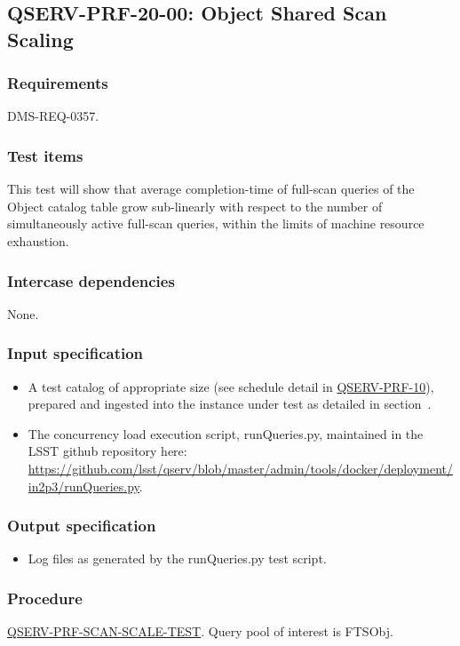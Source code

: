 \subsection{\textsc{QSERV-PRF-20-00}: Object Shared Scan Scaling}
\label{qserv-prf-20-00}

\subsubsection{Requirements}

DMS-REQ-0357.

\subsubsection{Test items}

This test will show that average completion-time of full-scan queries of the Object catalog table grow 
sub-linearly with respect to the number of simultaneously active full-scan queries, within the limits of 
machine resource exhaustion.

\subsubsection{Intercase dependencies}

None.

\subsubsection{Input specification}

\begin{itemize}

  \item{A test catalog of appropriate size (see schedule detail in \hyperref[qserv-prf-10]{\textsc{
  QSERV-PRF-10}}), prepared and ingested into the \product{} instance under test as detailed in 
  section~.}

  \item{The concurrency load execution script, runQueries.py, maintained in the LSST \product{}
  github repository here: \url{https://github.com/lsst/qserv/blob/master/admin/tools/docker/deployment/in2p3/runQueries.py}}.

\end{itemize}

\subsubsection{Output specification}

\begin{itemize}
  \item{Log files as generated by the runQueries.py test script.}
\end{itemize}

\subsubsection{Procedure}

\hyperref[qserv-prf-scan-scale-test]{\textsc{QSERV-PRF-SCAN-SCALE-TEST}}. 
Query pool of interest is FTSObj.
